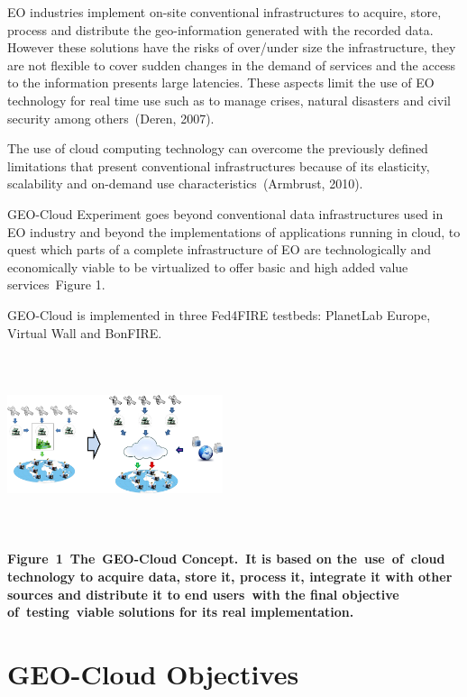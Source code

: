 \documentclass[a4paper]{article}
\begin{document}
\bigskip

EO industries implement on-site conventional infrastructures to acquire,
store, process and distribute the geo-information generated with the
recorded data. However these solutions have the risks of over/under
size the infrastructure, they are not flexible to cover sudden changes
in the demand of services and the access to the information presents
large latencies. These aspects limit the use of EO technology for real
time use such as to manage crises, natural disasters and civil security
among others\ (Deren, 2007).


\bigskip

The use of cloud computing technology can overcome the previously
defined limitations that present conventional infrastructures because
of its elasticity, scalability and on-demand use
characteristics\ (Armbrust, 2010).\ 


\bigskip

GEO-Cloud Experiment goes beyond conventional data infrastructures used
in EO industry and beyond the implementations of applications running
in cloud, to quest which parts of a complete infrastructure of EO are
technologically and economically viable to be virtualized to offer
basic and high added value services\ Figure 1.\ 


\bigskip

GEO-Cloud is implemented in three Fed4FIRE testbeds: PlanetLab Europe,
Virtual Wall and BonFIRE.

{\centering 
\includegraphics[width=2.4913in,height=2.06949in]{out-img5.png} \par}

{\bfseries
\label{bkm:Ref361933632}Figure\ 1\ The\ GEO-Cloud Concept.\ It is based
on the\ use\ of\ cloud technology to acquire data, store it, process
it, integrate it with other sources and distribute it to end
users\ with the final objective of\ testing\ viable solutions for its
real implementation.}

\section[GEO{}-Cloud Objectives]{GEO-Cloud Objectives}
\hypertarget{Toc378868685}{}
\bigskip
\end{document}
